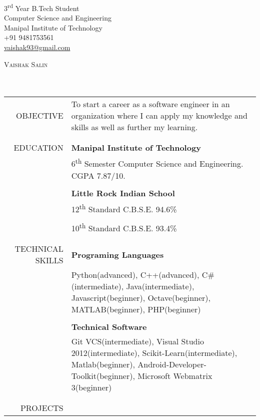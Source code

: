 \documentclass[a4paper, 10pt]{article}
\begin{document}
	\pagestyle{empty} %
	\begin{flushright}		
		3\textsuperscript{rd} Year B.Tech Student \\
		Computer Science and Engineering \\
		Manipal Institute of Technology \\
		+91 9481753561 \\
		\href{mailto: vaishak93@gmail.com}{vaishak93@gmail.com} \\
	\end{flushright}
	{\textsc {\Huge Vaishak Salin}} \\\\\\
	\begin{tabular}{rp{13cm}}
		OBJECTIVE 
		& To start a career as a software engineer in an organization where I can apply my knowledge and skills as well as further my learning. \\\\
		\hline
		\\
		EDUCATION
		& {\bf Manipal Institute of Technology} \\
		& 6\textsuperscript{th} Semester Computer Science and Engineering. CGPA 7.87/10. \\\\
		& {\bf Little Rock Indian School} \\
		& 12\textsuperscript{th} Standard C.B.S.E. 94.6\% \\\\
		& 10\textsuperscript{th} Standard C.B.S.E. 93.4\% \\\\
		\hline
		\\
		TECHNICAL SKILLS
		& {\bf Programing Languages} \\
		& Python(advanced), C++(advanced), C\#(intermediate), Java(intermediate), Javascript(beginner),
		Octave(beginner), MATLAB(beginner), PHP(beginner) \\\\
		& {\bf Technical Software} \\
		& Git VCS(intermediate), Visual Studio 2012(intermediate), Scikit-Learn(intermediate), Matlab(beginner), 
		Android-Developer-Toolkit(beginner), Microsoft Webmatrix 3(beginner) \\\\
		\hline
		\\
		PROJECTS
		& \vspace{-5mm} \begin{itemize} 

\end{itemize}
\end{tabular}
\end{document}
